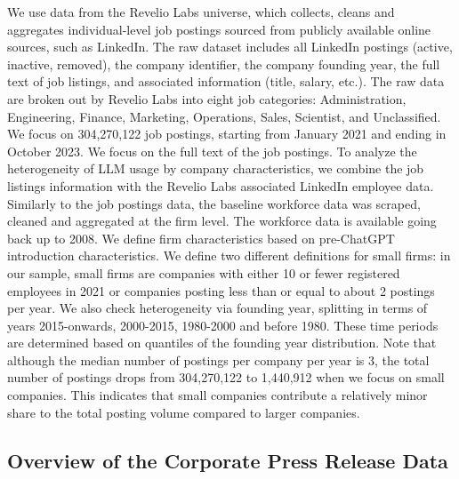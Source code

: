 We use data from the Revelio Labs universe, which collects, cleans and aggregates individual-level job postings sourced from publicly available online sources, such as LinkedIn. The raw dataset includes all LinkedIn postings (active, inactive, removed), the company identifier, the company founding year, the full text of job listings, and associated information (title, salary, etc.).  The raw data are broken out by Revelio Labs into eight job categories: Administration, Engineering, Finance, Marketing, Operations, Sales, Scientist, and Unclassified. We focus on 304,270,122 job postings, starting from January 2021 and ending in October 2023. We focus on the full text of the job postings. To analyze the heterogeneity of LLM usage by company characteristics, we combine the job listings information with the Revelio Labs associated LinkedIn employee data. Similarly to the job postings data, the baseline workforce data was scraped, cleaned and aggregated at the firm level. The workforce data is available going back up to 2008. We define firm characteristics based on pre-ChatGPT introduction characteristics. We define two different definitions for small firms: in our sample, small firms are companies with either 10 or fewer registered employees in 2021 or companies posting less than or equal to about 2 postings per year. We also check heterogeneity via founding year, splitting in terms of years 2015-onwards, 2000-2015, 1980-2000 and before 1980. These time periods are determined based on quantiles of the founding year distribution. Note that although the median number of postings per company per year is 3, the total number of postings drops from 304,270,122 to 1,440,912 when we focus on small companies. This indicates that small companies contribute a relatively minor share to the total posting volume compared to larger companies.












\subsection*{Overview of the Corporate Press Release Data}
\label{main:subsec:press-release-data}

